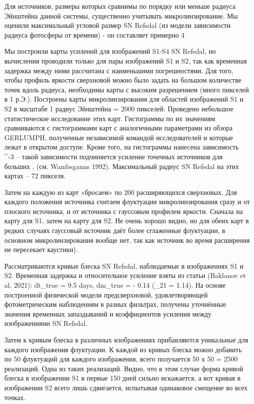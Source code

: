 Для источников, размеры которых сравнимы по порядку или меньше радиуса Эйнштейна данной системы, существенно учитывать микролинзирование. Мы оценили максимальный угловой размер SN Refsdal (из модели зависимости радиуса фотосферы от времени) - он составляет примерно 4%

Мы построили карты усилений для изображений S1-S4 SN Refsdal, но вычисления проводили только для пары изображений S1 и S2, так как временная задержка между ними рассчитана с наименьшими погрешностями. Для того, чтобы профиль яркости сверхновой можно было задать на большом количестве точек вдоль радиуса, необходимы карты с высоким разрешением (много пикселей в 1 р.Э.). Построены карты микролинзирования для областей изображений S1 и S2 в масштабе 1 радиус Эйнштейна = 2000 пикселей. Проведено небольшое статистическое исследование этих карт. Гистограммы по их значениям сравниваются с гистограммами карт с аналогичными параметрами из обзора GERLUMPH, полученные независимой командой исследователей и которые лежат в открытом доступе. Кроме того, на гистограммы нанесена зависимость \mu^{-3} – такой зависимости подчиняется усиление точечных источников для больших \mu. (см. Wambsganns 1992). Максимальный радиус SN Refsdal на этих картах – 72 пикселя. 

Затем на каждую из карт «бросаем» по 200 расширяющихся сверхновых. Для каждого положения источника считаем флуктуации микролинзирования сразу и от плоского источника, и от источника с гауссовым профилем яркости. Сначала на карту для S1, затем на карту для S2. Не очень хорошо видно, но для обеих карт в редких случаях гауссовый источник даёт более сглаженные флуктуации, в основном микролинзирования вообще нет, так как источник во время расширения не пересекает каустики).

Рассматриваются кривые блеска SN Refsdal, наблюдаемые в изображениях S1 и S2. Временная задержка и относительное усиление взяты из статьи (Baklanov et al. 2021): dt_true = 9.5 days, dm_true = - 0.14 (\mu_{21} = 1.14). На основе построенной физической модели предсверхновой, удовлетворяющей фотометрическим наблюдениям в разных фильтрах, получены уточнённые значения временных запаздываний и коэффициентов усиления между изображениями SN Refsdal.

Затем к кривым блеска в различных изображениях прибавляются уникальные для каждого изображения флуктуации. К каждой из кривых блеска можно добавить по 50 флуктуаций для каждого изображения, всего получается 50 х 50 = 2500 реализаций. Одна из таких реализаций. Видно, что в этом случае форма кривой блеска в изображении S1 в первые 150 дней сильно искажается, а вот кривая в изображении S2 всего лишь сдвигается, испытывая одинаковое смещение во всех точках.  


